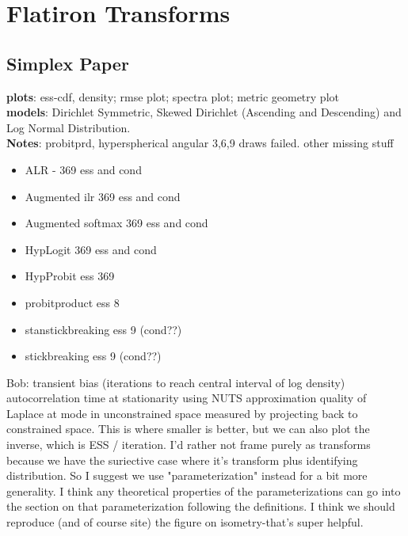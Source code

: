 \section{Flatiron Transforms}
\label{sec:transforms}
\subsection{Simplex Paper}

\textbf{plots}: ess-cdf, density; rmse plot; spectra plot; metric geometry plot\\

\textbf{models}: Dirichlet Symmetric, Skewed Dirichlet (Ascending and Descending) and Log Normal Distribution.\\

\textbf{Notes}: probitprd, hyperspherical angular 3,6,9 draws failed. other missing stuff
\begin{itemize}
\item ALR - 369 ess and cond
\item Augmented ilr 369 ess and cond
\item Augmented softmax 369 ess and cond
\item HypLogit 369 ess and cond
\item HypProbit ess 369

\item probitproduct ess 8
\item stanstickbreaking ess 9 (cond??)
\item stickbreaking ess 9 (cond??)
\end{itemize}


Bob: transient bias (iterations to reach central interval of log density)
autocorrelation time at stationarity using NUTS
approximation quality of Laplace at mode in unconstrained space measured by projecting back to constrained space. This is where smaller is better, but we can also plot the inverse, which is ESS / iteration. I'd rather not frame purely as transforms because we have the suriective case where it's transform plus identifying distribution. So I suggest we use "parameterization" instead for a bit more generality. I think any theoretical properties of the parameterizations can go into the section on that parameterization following the definitions. I think we should reproduce (and of course site) the figure on isometry-that's super helpful.